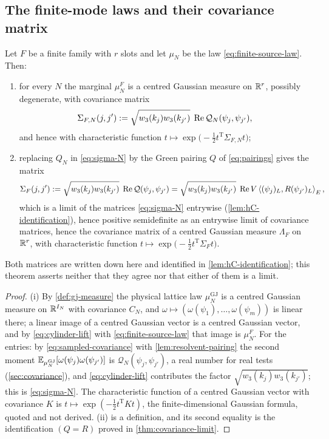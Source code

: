 \subsection{The finite-mode laws and their covariance matrix}

\begin{theorem}\label{thm:char-function}
Let $F$ be a finite family with $r$ slots and let $\mu_N$ be the law
\eqref{eq:finite-source-law}. Then:
\begin{enumerate}
\item[(i)] for every $N$ the marginal $\mu_N^F$ is a centred Gaussian measure on
  $\mathbb{R}^r$, possibly degenerate, with covariance matrix
  \begin{equation}\label{eq:sigma-N}
    \Sigma_{F,N}(j,j'):=\sqrt{w_3(k_j)w_3(k_{j'})}\;\operatorname{Re} \mathcal Q_N(\psi_j,\psi_{j'}),
  \end{equation}
  and hence with characteristic function
  $t\mapsto\exp\bigl(-\tfrac12t^{\mathrm T}\Sigma_{F,N}t\bigr)$;
\item[(ii)] replacing $Q_N$ in \eqref{eq:sigma-N} by the Green pairing $Q$ of
  \eqref{eq:pairings} gives the matrix
  \begin{equation}\label{eq:sigma-F}
    \Sigma_F(j,j'):=\sqrt{w_3(k_j)w_3(k_{j'})}\;\operatorname{Re}\mathcal Q(\psi_j,\psi_{j'})
    =\sqrt{w_3(k_j)w_3(k_{j'})}\;\operatorname{Re} V\left\langle (\psi_j)_L, R(\psi_{j'})_L \right\rangle_E ,
  \end{equation}
  which is a limit of the matrices \eqref{eq:sigma-N} entrywise
  (\cref{lem:hC-identification}), hence positive semidefinite as an entrywise
  limit of covariance matrices, hence the covariance matrix of a centred Gaussian
  measure $\Lambda_F$ on $\mathbb{R}^r$, with characteristic function
  $t\mapsto\exp\bigl(-\tfrac12t^{\mathrm T}\Sigma_Ft\bigr)$.
\end{enumerate}
Both matrices are written down here and identified in
\cref{lem:hC-identification}; this theorem asserts neither that they agree nor
that either of them is a limit.
\end{theorem}

\begin{proof}
(i) By \cref{def:gj-measure} the physical lattice law $\mu^{\mathrm{GJ}}_N$ is a
centred Gaussian measure on $\mathbb{R}^{I_N}$ with covariance $C_N$, and
$\omega\mapsto(\omega(\psi_1),\dots,\omega(\psi_m))$ is linear there; a linear
image of a centred Gaussian vector is a centred Gaussian vector, and by
\eqref{eq:cylinder-lift} with \eqref{eq:finite-source-law} that image is
$\mu_N^F$. For the entries: by \eqref{eq:sampled-covariance} with
\cref{lem:resolvent-pairing} the second moment
$\mathbb{E}_{\mu^{\mathrm{GJ}}_N}[\omega(\psi_j)\omega(\psi_{j'})]$ is
$\mathcal Q_N(\psi_j,\psi_{j'})$, a real number for real tests (\cref{sec:covariance}),
and \eqref{eq:cylinder-lift} contributes the factor
$\sqrt{w_3(k_j)w_3(k_{j'})}$; this is \eqref{eq:sigma-N}. The characteristic
function of a centred Gaussian vector with covariance $K$ is
$t\mapsto\exp(-\tfrac12t^{\mathrm T}Kt)$, the finite-dimensional Gaussian
formula, quoted and not derived. (ii) is a definition, and its second equality
is the identification $(Q=R)$ proved in \cref{thm:covariance-limit}.
\end{proof}

